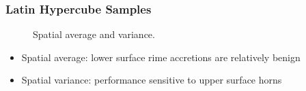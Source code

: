 \documentclass[9pt]{beamer}
\begin{document}
\begin{frame}
\frametitle{Latin Hypercube Samples}
\label{sec-2-12}

\vspace*{-0.0cm}\begin{figure}
      \caption{Spatial average and variance.}
\end{figure}
\begin{itemize}
\item Spatial average: lower surface rime accretions are relatively benign
\item Spatial variance: performance sensitive to upper surface horns
\end{itemize}
\end{frame}
\end{document}
